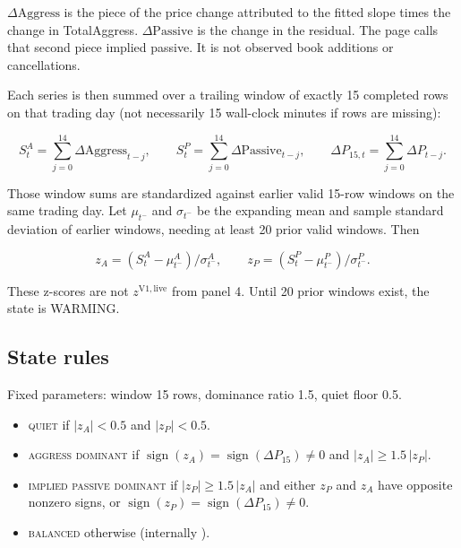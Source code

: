 \documentclass[11pt]{article}
\newcommand{\code}[1]{\texttt{\detokenize{#1}}}
\begin{document}
\(\Delta\mathrm{Aggress}\) is the piece of the price change attributed
to the fitted slope times the change in TotalAggress.
\(\Delta\mathrm{Passive}\) is the change in the residual.  The page
calls that second piece implied passive.  It is not observed book
additions or cancellations.

Each series is then summed over a trailing window of exactly 15
completed rows on that trading day (not necessarily 15 wall-clock minutes
if rows are missing):

\begin{equation}
S^A_t=\sum_{j=0}^{14}\Delta\mathrm{Aggress}_{t-j},
\qquad
S^P_t=\sum_{j=0}^{14}\Delta\mathrm{Passive}_{t-j},
\qquad
\Delta P_{15,t}=\sum_{j=0}^{14}\Delta P_{t-j}.
\end{equation}

Those window sums are standardized against earlier valid 15-row windows
on the same trading day.  Let \(\mu_{t^-}\) and \(\sigma_{t^-}\) be the
expanding mean and sample standard deviation of earlier windows, needing
at least 20 prior valid windows.  Then

\begin{equation}
z_A=(S^A_t-\mu^A_{t^-})/\sigma^A_{t^-},
\qquad
z_P=(S^P_t-\mu^P_{t^-})/\sigma^P_{t^-}.
\end{equation}

These z-scores are not \(z^{\mathrm{V1,live}}\) from panel 4.  Until 20
prior windows exist, the state is WARMING.

\subsection{State rules}

Fixed parameters: window 15 rows, dominance ratio 1.5, quiet floor 0.5.

\begin{itemize}
    \item \textsc{quiet} if \(|z_A|<0.5\) and \(|z_P|<0.5\).
    \item \textsc{aggress dominant} if \(\operatorname{sign}(z_A)=\operatorname{sign}(\Delta P_{15})\ne 0\)
    and \(|z_A|\ge 1.5\,|z_P|\).
    \item \textsc{implied passive dominant} if \(|z_P|\ge 1.5\,|z_A|\) and
    either \(z_P\) and \(z_A\) have opposite nonzero signs, or
    \(\operatorname{sign}(z_P)=\operatorname{sign}(\Delta P_{15})\ne 0\).
    \item \textsc{balanced} otherwise (internally \code{NEITHER}).
\end{itemize}
\end{document}
